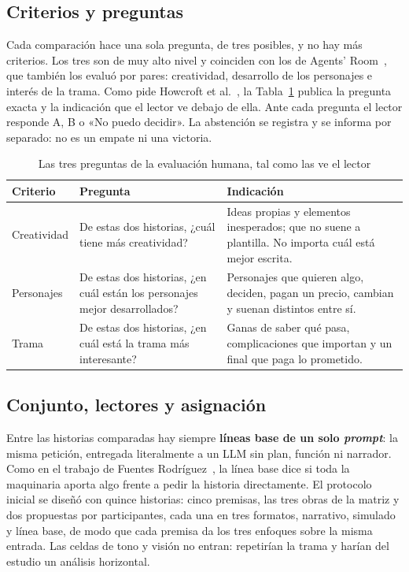 \subsection{Criterios y preguntas}\label{sec:criterios}

Cada comparación hace una sola pregunta, de tres posibles, y no hay más criterios. Los tres son de
muy alto nivel y coinciden con los de Agents' Room~\cite{huot2025}, que también los evaluó por pares:
creatividad, desarrollo de los personajes e interés de la trama. Como pide Howcroft et
al.~\cite{howcroft2020}, la Tabla~\ref{tab:criterios} publica la pregunta exacta y la indicación que
el lector ve debajo de ella. Ante cada pregunta el lector responde A, B o «No puedo decidir». La
abstención se registra y se informa por separado: no es un empate ni una victoria.

\begin{table}[htb]
  \centering
  \caption{Las tres preguntas de la evaluación humana, tal como las ve el lector}
  \label{tab:criterios}
  \small
  \begin{tabular}{@{}>{\raggedright\arraybackslash}p{2.0cm}>{\raggedright\arraybackslash}p{5.6cm}%
      >{\raggedright\arraybackslash}p{6.2cm}@{}}
    \toprule
    Criterio & Pregunta & Indicación \\
    \midrule
    Creatividad & De estas dos historias, ¿cuál tiene más creatividad? & Ideas propias y elementos
      inesperados; que no suene a plantilla. No importa cuál está mejor escrita. \\
    Personajes & De estas dos historias, ¿en cuál están los personajes mejor desarrollados? &
      Personajes que quieren algo, deciden, pagan un precio, cambian y suenan distintos entre sí. \\
    Trama & De estas dos historias, ¿en cuál está la trama más interesante? & Ganas de saber qué
      pasa, complicaciones que importan y un final que paga lo prometido. \\
    \bottomrule
  \end{tabular}
\end{table}

\subsection{Conjunto, lectores y asignación}\label{sec:conjunto}

Entre las historias comparadas hay siempre \textbf{líneas base de un solo \textit{prompt}}: la misma
petición, entregada literalmente a un LLM sin plan, función ni narrador. Como en el trabajo de
Fuentes Rodríguez~\cite{fuentes2025}, la línea base dice si toda la maquinaria aporta algo frente a
pedir la historia directamente. El protocolo inicial se diseñó con quince historias: cinco
premisas, las tres obras de la matriz y dos propuestas por participantes, cada una en tres
formatos, narrativo, simulado y línea base, de modo que cada premisa da los tres enfoques sobre la
misma entrada. Las celdas de tono y visión no entran: repetirían la trama y harían del estudio un
análisis horizontal.

